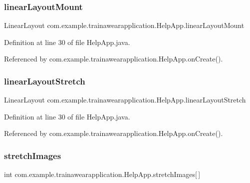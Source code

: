 \subsubsection{\texorpdfstring{linearLayoutMount}{linearLayoutMount}}
{\footnotesize\ttfamily Linear\+Layout com.\+example.\+trainawearapplication.\+Help\+App.\+linear\+Layout\+Mount\hspace{0.3cm}{\ttfamily [package]}}



Definition at line 30 of file Help\+App.\+java.



Referenced by com.\+example.\+trainawearapplication.\+Help\+App.\+on\+Create().

\mbox{\label{classcom_1_1example_1_1trainawearapplication_1_1_help_app_a28ea93e9921eb7a2c0641c261beddc00}} 
\subsubsection{\texorpdfstring{linearLayoutStretch}{linearLayoutStretch}}
{\footnotesize\ttfamily Linear\+Layout com.\+example.\+trainawearapplication.\+Help\+App.\+linear\+Layout\+Stretch\hspace{0.3cm}{\ttfamily [package]}}



Definition at line 30 of file Help\+App.\+java.



Referenced by com.\+example.\+trainawearapplication.\+Help\+App.\+on\+Create().

\mbox{\label{classcom_1_1example_1_1trainawearapplication_1_1_help_app_a409e91221d680c3d801ea24a3f58fcdc}} 
\subsubsection{\texorpdfstring{stretchImages}{stretchImages}}
{\footnotesize\ttfamily int com.\+example.\+trainawearapplication.\+Help\+App.\+stretch\+Images\mbox{[}$\,$\mbox{]}\hspace{0.3cm}{\ttfamily [private]}}

